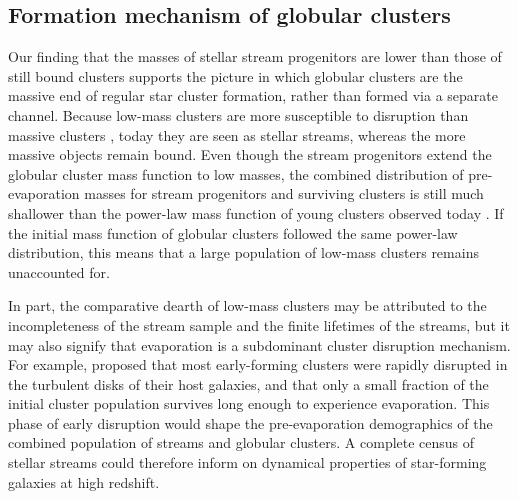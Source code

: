 \documentclass[twocolumn]{aastex63}
\begin{document}
\subsection{Formation mechanism of globular clusters}
\label{sec:discuss_gcform}
Our finding that the masses of stellar stream progenitors are lower than those of still bound clusters supports the picture in which globular clusters are the massive end of regular star cluster formation, rather than formed via a separate channel.
Because low-mass clusters are more susceptible to disruption than massive clusters \citep[e.g.,][]{fall:2001,kruijssen15b,reinacampos18}, today they are seen as stellar streams, whereas the more massive objects remain bound.
Even though the stream progenitors extend the globular cluster mass function to low masses, the combined distribution of pre-evaporation masses for stream progenitors and surviving clusters is still much shallower than the power-law mass function of young clusters observed today \citep[e.g.,][]{zhang:1999}.
If the initial mass function of globular clusters followed the same power-law distribution, this means that a large population of low-mass clusters remains unaccounted for.

In part, the comparative dearth of low-mass clusters may be attributed to the incompleteness of the stream sample and the finite lifetimes of the streams, but it may also signify that evaporation is a subdominant cluster disruption mechanism.
For example, \citet{kruijssen15b} proposed that most early-forming clusters were rapidly disrupted in the turbulent disks of their host galaxies, and that only a small fraction of the initial cluster population survives long enough to experience evaporation.
This phase of early disruption would shape the pre-evaporation demographics of the combined population of streams and globular clusters.
A complete census of stellar streams could therefore inform on dynamical properties of star-forming galaxies at high redshift.
\end{document}
